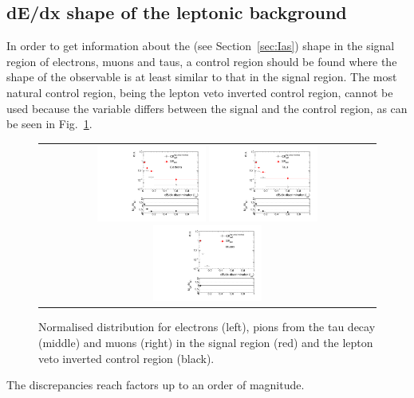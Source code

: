\FloatBarrier
\subsection{dE/dx shape of the leptonic background}
In order to get information about the \ias (see Section~\ref{sec:Ias}) shape in the signal region of electrons, muons and taus, a control region should be found where the shape of the observable is at least similar to that in the
signal region.
The most natural control region, being the lepton veto inverted control region, cannot be used because the variable \ias differs between the signal and the control region, as can be seen in Fig.~\ref{fig:LeptonIasDist}.
\begin{figure}[!b]
  \centering 
  \begin{tabular}{c}
    \includegraphics[width=0.33\textwidth]{figures/analysis/Background/hASmi_Electrons_MCCR_MCSR.pdf}
    \includegraphics[width=0.33\textwidth]{figures/analysis/Background/hASmi_Taus_MCCR_MCSR.pdf}
    \includegraphics[width=0.33\textwidth]{figures/analysis/Background/hASmi_Muons_MCCR_MCSR.pdf}
  \end{tabular}
  \caption{Normalised \ias distribution for electrons (left), pions from the tau decay (middle) and muons (right) in the signal region (red) and the lepton veto inverted control region (black).}
  \label{fig:LeptonIasDist}
\end{figure}
The discrepancies reach factors up to an order of magnitude.


